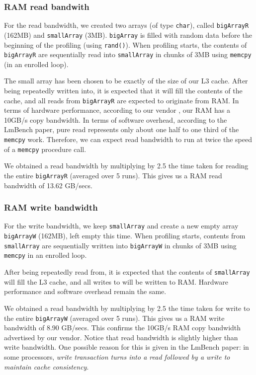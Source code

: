 \subsubsection{RAM read bandwith}

For the read bandwidth, we created two arrays (of type \texttt{char}), called \texttt{bigArrayR} (162MB) and \texttt{smallArray} (3MB). \texttt{bigArray} is filled with random data before the beginning of the profiling (using \texttt{rand()}). When profiling starts, the contents of \texttt{bigArrayR} are sequentially read into \texttt{smallArray} in chunks of 3MB using \texttt{memcpy}  (in an enrolled loop).

The small array has been chosen to be exactly of the size of our L3 cache. After being repeatedly written into, it is expected that it will fill the contents of the cache, and all reads from \texttt{bigArrayR} are expected to originate from RAM. In terms of hardware performance, according to our vendor \cite{lenovo}, our RAM has a 10GB/s copy bandwidth. In terms of software overhead, according to the LmBench paper, pure read represents only about one half to one third of the \texttt{memcpy} work. Therefore, we can expect read bandwidth to run at twice the speed of a \texttt{memcpy} procedure call.

We obtained a read bandwidth by multiplying by 2.5 the time taken for reading the entire \texttt{bigArrayR} (averaged over 5 runs). This gives us a RAM read bandwidth of 13.62 GB/secs.

\subsubsection{RAM write bandwidth}

For the write bandwidth, we keep \texttt{smallArray} and create a new empty array \texttt{bigArrayW} (162MB), left empty this time. When profiling starts, contents from \texttt{smallArray} are sequentially written into \texttt{bigArrayW} in chunks of 3MB using \texttt{memcpy} in an enrolled loop.

After being repeatedly read from, it is expected that the contents of \texttt{smallArray} will fill the L3 cache, and all writes to  will be written to RAM. Hardware performance and software overhead remain the same.

We obtained a read bandwidth by multiplying by 2.5 the time taken for write to the entire \texttt{bigArrayW} (averaged over 5 runs). This gives us a RAM write bandwidth of 8.90 GB/secs. This confirms the 10GB/s RAM copy bandwidth advertised by our vendor. Notice that read bandwidth is slightly higher than write bandwidth. One possible reason for this is given in the LmBench paper: in some processors, \emph{write transaction turns into a read followed by a write to maintain cache consistency}.

